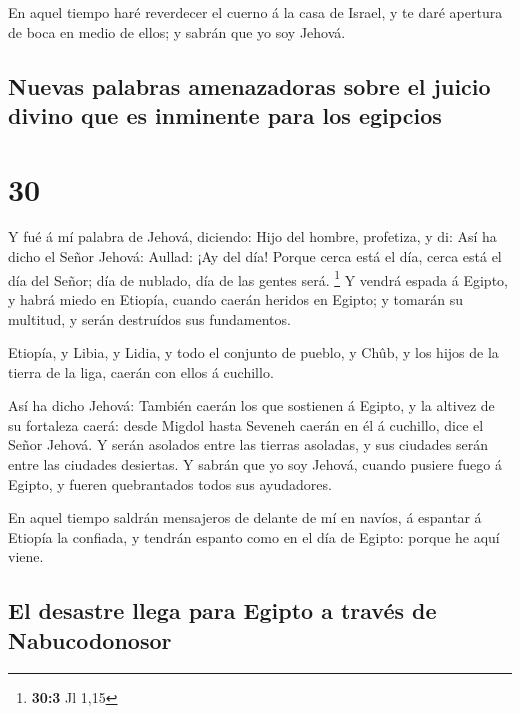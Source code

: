  En aquel tiempo haré reverdecer el cuerno á la casa de
Israel, y te daré apertura de boca en medio de ellos; y sabrán que yo
soy Jehová.

\hypertarget{nuevas-palabras-amenazadoras-sobre-el-juicio-divino-que-es-inminente-para-los-egipcios}{%
\subsection{Nuevas palabras amenazadoras sobre el juicio divino que es
inminente para los
egipcios}\label{nuevas-palabras-amenazadoras-sobre-el-juicio-divino-que-es-inminente-para-los-egipcios}}

\hypertarget{section-29}{%
\section{30}\label{section-29}}

 Y fué á mí palabra de Jehová, diciendo: 
Hijo del hombre, profetiza, y di: Así ha dicho el Señor Jehová: Aullad:
¡Ay del día!  Porque cerca está el día, cerca está el día
del Señor; día de nublado, día de las gentes será. \footnote{\textbf{30:3}
  Jl 1,15}  Y vendrá espada á Egipto, y habrá miedo en
Etiopía, cuando caerán heridos en Egipto; y tomarán su multitud, y serán
destruídos sus fundamentos.

 Etiopía, y Libia, y Lidia, y todo el conjunto de pueblo,
y Chûb, y los hijos de la tierra de la liga, caerán con ellos á
cuchillo.

 Así ha dicho Jehová: También caerán los que sostienen á
Egipto, y la altivez de su fortaleza caerá: desde Migdol hasta Seveneh
caerán en él á cuchillo, dice el Señor Jehová.  Y serán
asolados entre las tierras asoladas, y sus ciudades serán entre las
ciudades desiertas.  Y sabrán que yo soy Jehová, cuando
pusiere fuego á Egipto, y fueren quebrantados todos sus ayudadores.

 En aquel tiempo saldrán mensajeros de delante de mí en
navíos, á espantar á Etiopía la confiada, y tendrán espanto como en el
día de Egipto: porque he aquí viene.

\hypertarget{el-desastre-llega-para-egipto-a-travuxe9s-de-nabucodonosor}{%
\subsection{El desastre llega para Egipto a través de
Nabucodonosor}\label{el-desastre-llega-para-egipto-a-travuxe9s-de-nabucodonosor}}


